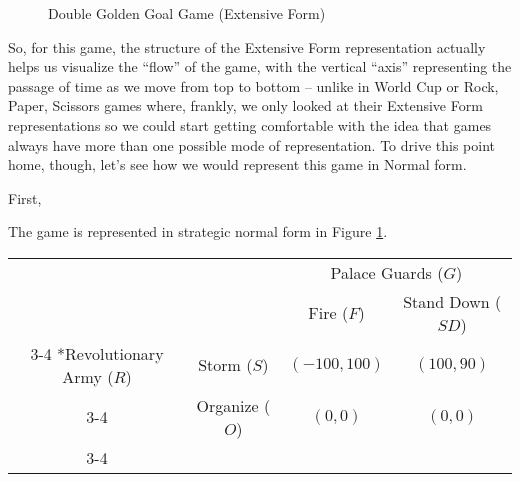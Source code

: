 \begin{figure}
\centering
{}
\caption{Double Golden Goal Game (Extensive Form)\label{fig:dgg}}
\end{figure}

So, for this game, the structure of the Extensive Form representation actually helps us visualize the ``flow'' of the game, with the vertical ``axis'' representing the passage of time as we move from top to bottom -- unlike in World Cup or Rock, Paper, Scissors games where, frankly, we only looked at their Extensive Form representations so we could start getting comfortable with the idea that games always have more than one possible mode of representation. To drive this point home, though, let's see how we would represent this game in Normal form.

First, 

The game is represented in strategic normal form in Figure \ref{fig:revgame}.

\begin{table}[ht!]
    \centering
    \setlength{\extrarowheight}{2pt}
    \begin{tabular}{cc|c|c|}
      & \multicolumn{1}{c}{} & \multicolumn{2}{c}{Palace Guards ($G$)}\\
      & \multicolumn{1}{c}{} & \multicolumn{1}{c}{Fire ($F$)}  & \multicolumn{1}{c}{Stand Down ($SD$)} \\\cline{3-4}
      \multirow{2}*{Revolutionary Army ($R$)}  & Storm ($S$) & $(-100,100)$ & $(100,90)$ \\\cline{3-4}
      & Organize ($O$) & $(0,0)$ & $(0,0)$ \\\cline{3-4}
    \end{tabular}
\label{fig:revgame}
\end{table}

